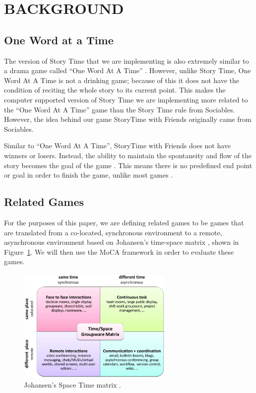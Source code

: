 \documentclass{sigchi}
\begin{document}
\section{BACKGROUND}
\subsection{One Word at a Time}
The version of Story Time that we are implementing is also extremely similar to a drama game called ``One Word At A Time'' \cite{dramaresource, izzyg, sociablesrules}. However, unlike Story Time, One Word At A Time is not a drinking game; because of this it does not have the condition of reciting the whole story to its current point. This makes the computer supported version of Story Time we are implementing more related to the ``One Word At A Time'' game than the Story Time rule from Sociables. However, the idea behind our game StoryTime with Friends originally came from Sociables.

Similar to ``One Word At A Time'', StoryTime with Friends does not have winners or losers. Instead, the ability to maintain the spontaneity and flow of the story becomes the goal of the game \cite{improv.ca}. This means there is no predefined end point or goal in order to finish the game, unlike most games \cite{learn-canvas, badge-ville, makeschool}. 

\subsection{Related Games}
For the purposes of this paper, we are defining related games to be games that are translated from a co-located, synchronous environment to a remote, asynchronous environment based on Johansen's time-space matrix \cite{cscw-matrix}, shown in Figure~\ref{fig:cscw-matrix}. We will then use the MoCA framework \cite{MoCA} in order to evaluate these games.

\begin{figure}[H]
\centering
\includegraphics[width=7.5cm]{Cscwmatrix.jpg}
\caption{Johansen's Space Time matrix \protect\cite{cscw-matrix-figure}.}
\label{fig:cscw-matrix}
\end{figure}
\end{document}
